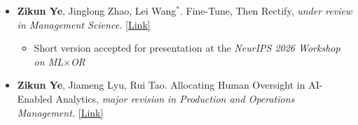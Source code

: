 \documentclass[margin,line]{resume}
\begin{document}
\begin{resume}
\begin{itemize}[topsep=-5mm, leftmargin=0mm]
\vspace{\medskipamount}

\item[] \textbf{Zikun Ye}, Jinglong Zhao, Lei Wang$^{*}$. Fine-Tune, Then Rectify, \textit{under review in Management Science.} \href{https://papers.ssrn.com/sol3/papers.cfm?abstract_id=5763184}{[Link]}
    \begin{itemize}
        \item [-] Short version accepted for presentation at the \textit{NeurIPS 2026 Workshop on ML$\times$OR}
    \end{itemize}

\vspace{\medskipamount}

\item[] \textbf{Zikun Ye}, Jiameng Lyu, Rui Tao. Allocating Human Oversight in AI-Enabled Analytics, \textit{major revision in Production and Operations Management.} \href{https://papers.ssrn.com/sol3/papers.cfm?abstract_id=6561778}{[Link]}

 \end{itemize}

\end{resume}
\end{document}
